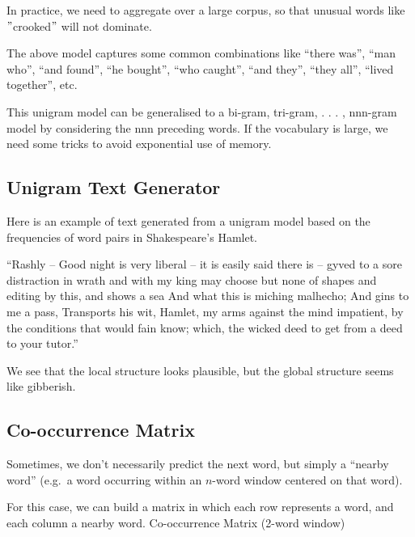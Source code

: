 \documentclass[11pt]{article}
\begin{document}
In practice, we need to aggregate over a large corpus, so that unusual words like \("\)crooked\("\) will not dominate.

The above model captures some common combinations like “there was”, “man who”, “and found”, “he bought”, “who caught”, “and they”, “they all”, “lived together”, etc.

This unigram model can be generalised to a bi-gram, tri-gram, . . . , nnn-gram model by considering the nnn preceding words.
If the vocabulary is large, we need some tricks to avoid exponential use of memory.

\subsection{Unigram Text Generator}\label{subsec:unigram-text-generator}
Here is an example of text generated from a unigram model based on the frequencies of word pairs in Shakespeare's Hamlet.

“Rashly – Good night is very liberal – it is easily said there is – gyved to a sore distraction in wrath and with my king may choose but none of shapes and editing by this, and shows a sea And what this is miching malhecho;
And gins to me a pass, Transports his wit, Hamlet, my arms against the mind impatient, by the conditions that would fain know;
which, the wicked deed to get from a deed to your tutor.”

We see that the local structure looks plausible, but the global structure seems like gibberish.

\subsection{Co-occurrence Matrix}\label{subsec:co-occurrence-matrix}
Sometimes, we don’t necessarily predict the next word, but simply a “nearby word” (e.g.\ a word occurring within an $n$-word window centered on that word).

For this case, we can build a matrix in which each row represents a word, and each column a nearby word.
Co-occurrence Matrix (2-word window)
\end{document}
